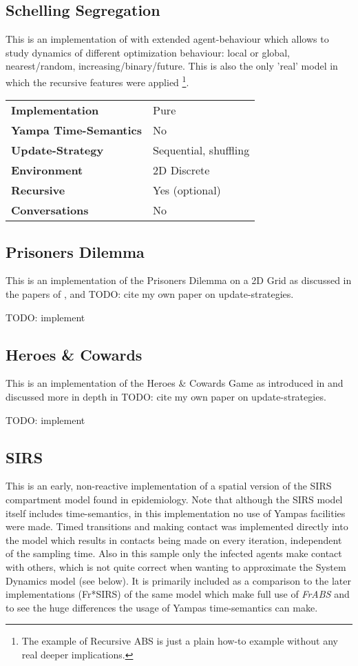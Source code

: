 \subsection{Schelling Segregation}
This is an implementation of \cite{schelling_dynamic_1971} with extended agent-behaviour which allows to study dynamics of different optimization behaviour: local or global, nearest/random, increasing/binary/future. This is also the only 'real' model in which the recursive features were applied \footnote{The example of Recursive ABS is just a plain how-to example without any real deeper implications.}.

\begin{center}
\begin{tabular}{l || l }
\textbf{Implementation}			& Pure \\
\textbf{Yampa Time-Semantics}	& No \\
\textbf{Update-Strategy}		& Sequential, shuffling \\
\textbf{Environment}			& 2D Discrete \\
\textbf{Recursive}				& Yes (optional) \\
\textbf{Conversations}			& No \\
\end{tabular}
\end{center}

\subsection{Prisoners Dilemma}
This is an implementation of the Prisoners Dilemma on a 2D Grid as discussed in the papers of \cite{nowak_evolutionary_1992}, \cite{huberman_evolutionary_1993} and TODO: cite my own paper on update-strategies.

TODO: implement

\subsection{Heroes \& Cowards}
This is an implementation of the Heroes \& Cowards Game as introduced in \cite{wilensky_introduction_2015} and discussed more in depth in TODO: cite my own paper on update-strategies.

TODO: implement

\subsection{SIRS}
This is an early, non-reactive implementation of a spatial version of the SIRS compartment model found in epidemiology. Note that although the SIRS model itself includes time-semantics, in this implementation no use of Yampas facilities were made. Timed transitions and making contact was implemented directly into the model which results in contacts being made on every iteration, independent of the sampling time. Also in this sample only the infected agents make contact with others, which is not quite correct when wanting to approximate the System Dynamics model (see below). It is primarily included as a comparison to the later implementations (Fr*SIRS) of the same model  which make full use of \textit{FrABS} and to see the huge differences the usage of Yampas time-semantics can make.

